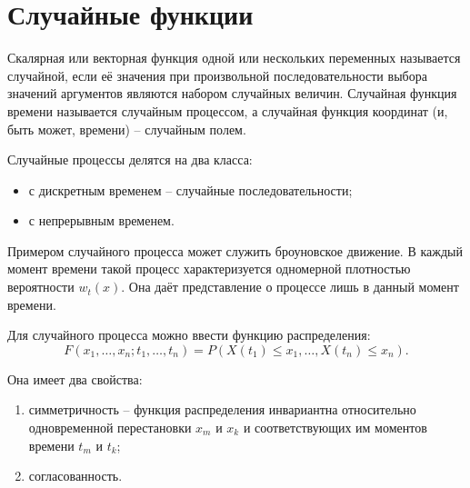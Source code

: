 \section{Случайные функции}

Скалярная или векторная функция одной или нескольких переменных называется
случайной, если её значения при произвольной последовательности выбора значений
аргументов являются набором случайных величин. Случайная функция времени
называется случайным процессом, а случайная функция координат (и, быть может,
времени) -- случайным полем.

Случайные процессы делятся на два класса:
\begin{itemize}
    \item с дискретным временем -- случайные последовательности;
    \item с непрерывным временем.
\end{itemize}

Примером случайного процесса может служить броуновское движение. В каждый момент
времени такой процесс характеризуется одномерной плотностью вероятности
\( w_t(x) \). Она даёт представление о процессе лишь в данный момент времени.

Для случайного процесса можно ввести функцию распределения:
\[
    F(x_1, \ldots, x_n; t_1, \ldots, t_n) =
        P(X(t_1) \le x_1, \ldots, X(t_n) \le x_n).
\]

Она имеет два свойства:
\begin{enumerate}
    \item симметричность -- функция распределения инвариантна относительно
        одновременной перестановки \( x_m \) и \( x_k \) и соответствующих
        им моментов времени \( t_m \) и \( t_k \);
    \item согласованность.
\end{enumerate}
